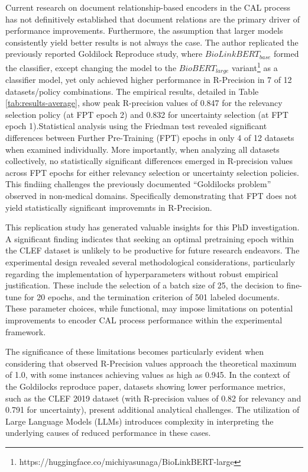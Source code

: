 \documentclass[10pt, english]{article}
\begin{document}
Current research on document relationship-based encoders in the CAL process has not definitively established that document relations are the primary driver of performance improvements. Furthermore, the assumption that larger models consistently yield better results is not always the case. The author replicated the previously reported Goldilock Reproduce study, where $BioLinkBERT_{base}$ formed the classifier, except changing the model to the $BioBERT_{large}$ variant\footnote{https://huggingface.co/michiyasunaga/BioLinkBERT-large} as a classifier model, yet only achieved higher performance in R-Precision in 7 of 12 datasets/policy combinations.  The empirical results, detailed in Table \ref{tab:results-average}, show peak R-precision values of 0.847 for the relevancy selection policy (at FPT epoch 2) and 0.832 for uncertainty selection (at FPT epoch 1).Statistical analysis using the Friedman test revealed significant differences between Further Pre-Training (FPT) epochs in only 4 of 12 datasets when examined individually. More importantly, when analyzing all datasets collectively, no statistically significant differences emerged in R-precision values across FPT epochs for either relevancy selection or uncertainty selection policies. This findiing challenges the previously documented  ``Goldilocks problem'' observed in non-medical domains. Specifically demonstrating that FPT does not yield statistically significant improvemnts in R-Precision. 

This replication study has generated valuable insights for this PhD investigation. A significant finding indicates that seeking an optimal pretraining epoch within the CLEF dataset is unlikely to be productive for future research endeavors. The experimental design revealed several methodological considerations, particularly regarding the implementation of hyperparameters without robust empirical justification. These include the selection of a batch size of 25, the decision to fine-tune for 20 epochs, and the termination criterion of 501 labeled documents. These parameter choices, while functional, may impose limitations on potential improvements to encoder CAL process performance within the experimental framework.

The significance of these limitations becomes particularly evident when considering that observed R-Precision values approach the theoretical maximum of 1.0, with some instances achieving values as high as 0.945. In the context of the Goldilocks reproduce paper, datasets showing lower performance metrics, such as the CLEF 2019 dataset (with R-precision values of 0.82 for relevancy and 0.791 for uncertainty), present additional analytical challenges. The utilization of Large Language Models (LLMs) introduces complexity in interpreting the underlying causes of reduced performance in these cases.
\end{document}
